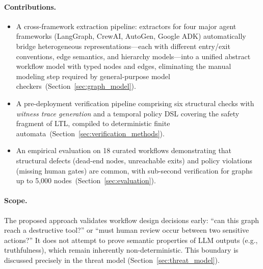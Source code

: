 \paragraph{Contributions.}
\begin{itemize}
  \item A cross-framework extraction pipeline: extractors for four major
  agent frameworks (LangGraph, CrewAI, AutoGen, Google ADK) automatically
  bridge heterogeneous representations---each with different entry/exit
  conventions, edge semantics, and hierarchy models---into a unified
  abstract workflow model with typed nodes and edges, eliminating the
  manual modeling step required by general-purpose model
  checkers~(Section~\ref{sec:graph_model}).
  \item A pre-deployment verification pipeline comprising six
  structural checks with \emph{witness trace generation} and a temporal
  policy DSL covering the safety fragment of LTL, compiled to
  deterministic finite automata~(Section~\ref{sec:verification_methods}).
  \item An empirical evaluation on 18 curated workflows demonstrating
  that structural defects (dead-end nodes, unreachable exits) and
  policy violations (missing human gates) are common, with sub-second
  verification for graphs up to 5{,}000
  nodes~(Section~\ref{sec:evaluation}).
\end{itemize}

\paragraph{Scope.}
The proposed approach validates workflow design decisions early: ``can this
graph reach a destructive tool?'' or ``must human review occur between
two sensitive actions?'' It does not attempt to prove semantic
properties of LLM outputs (e.g., truthfulness), which remain
inherently non-deterministic. This boundary is discussed precisely in
the threat model (Section~\ref{sec:threat_model}).
